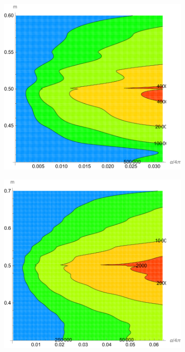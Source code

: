 \documentclass[10pt]{article}
\theoremstyle{definition}
\theoremstyle{remark}
\begin{document}
	\begin{figure}[h]
		\centering
		\begin{subfigure}{0.3\textwidth}
			\centering
			\includegraphics[width=\textwidth]{binned_0.1GeV.pdf}
			\caption{}
		\end{subfigure}
		\begin{subfigure}{0.3\textwidth}
			\centering
			\includegraphics[width=\textwidth]{binned_0.2GeV.pdf}

\end{subfigure}
\end{figure}
\end{document}
